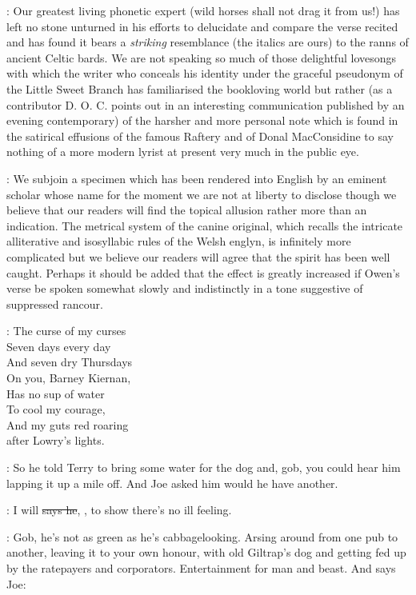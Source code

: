 :
Our greatest living
phonetic expert
(wild horses shall not drag it from us!) has left no stone
unturned in his efforts to delucidate and compare the verse recited and has
found it bears a \emph{striking} resemblance (the italics are ours) to the ranns
of ancient Celtic bards. We are not speaking so much of those delightful
lovesongs with which the writer who conceals his identity under the
graceful pseudonym of the Little Sweet Branch has familiarised the
bookloving world but rather (as a contributor D. O. C. points out in an
interesting communication published by an evening contemporary) of the
harsher and more personal note which is found in the satirical effusions
of the famous Raftery and of Donal MacConsidine to say nothing of a more
modern lyrist at present very much in the public eye.%

:
We subjoin a
specimen which has been rendered into English by an eminent scholar
whose name for the moment we are not at liberty to disclose though
we believe that our readers will find the topical allusion rather
more than an indication. The metrical system of the canine original,
which recalls the intricate alliterative and isosyllabic rules of
the Welsh englyn, is infinitely more complicated but we believe our
readers will agree that the spirit has been well caught. Perhaps
it should be added that the effect is greatly increased if Owen's
verse be spoken somewhat slowly and indistinctly in a tone suggestive
of suppressed rancour.

\garryowen:
    The curse
       of my curses\\
    Seven days every day\\
    And seven dry Thursdays\\
    On you, Barney Kiernan,\\
    Has no sup of water\\
    To cool my courage,\\
    And my guts red roaring\\
    after Lowry's lights.

\Nq:
So he told Terry to bring some water for the dog and, gob, you could
hear him lapping it up a mile off. And Joe asked him would he have
another.%

\citizen:
I will \sout{says he}, ,
to show there's no ill feeling.

\Nq:
Gob, he's not as green as he's cabbagelooking. Arsing around from
one pub to another, leaving it to your own honour, with old Giltrap's dog
and getting fed up by the ratepayers and corporators. Entertainment for
man and beast. And says Joe:

